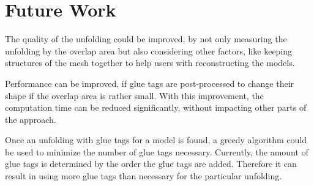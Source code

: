 \documentclass[draft,final]{vutinfth} %
\begin{document}
\section{Future Work}
The quality of the unfolding could be improved, by not only measuring the unfolding by the overlap area but also considering other factors, like keeping structures of the mesh together to help users with reconstructing the models.

Performance can be improved, if glue tags are post-processed to change their shape if the overlap area is rather small. With this improvement, the computation time can be reduced significantly, without impacting other parts of the approach.

Once an unfolding with glue tags for a model is found, a greedy algorithm could be used to minimize the number of glue tags necessary. Currently, the amount of glue tags is determined by the order the glue tags are added. Therefore it can result in using more glue tags than necessary for the particular unfolding.
\backmatter

\listoffigures %

\cleardoublepage %
\listoftables %

\listofalgorithms
{}

\printindex

\printglossaries



\end{document}
